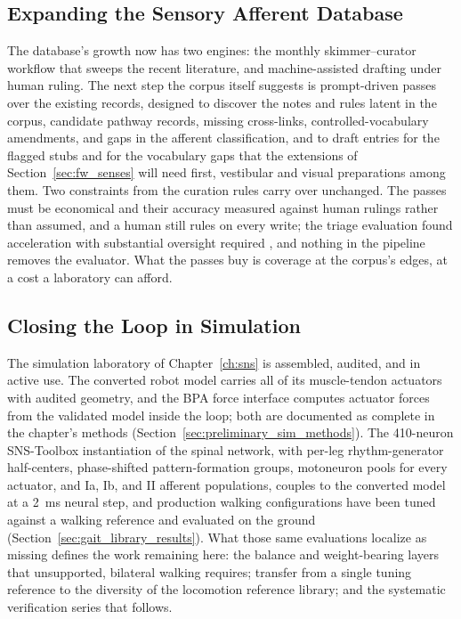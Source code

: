\subsection{Expanding the Sensory Afferent Database}\label{sec:fw_database}

The database's growth now has two engines: the monthly skimmer--curator workflow that sweeps the recent literature, and machine-assisted drafting under human ruling. The next step the corpus itself suggests is prompt-driven passes over the existing records, designed to discover the notes and rules latent in the corpus, candidate pathway records, missing cross-links, controlled-vocabulary amendments, and gaps in the afferent classification, and to draft entries for the flagged stubs and for the vocabulary gaps that the extensions of Section~\ref{sec:fw_senses} will need first, vestibular and visual preparations among them. Two constraints from the curation rules carry over unchanged. The passes must be economical and their accuracy measured against human rulings rather than assumed, and a human still rules on every write; the triage evaluation found acceleration with substantial oversight required \citep{bolen_using_2024}, and nothing in the pipeline removes the evaluator. What the passes buy is coverage at the corpus's edges, at a cost a laboratory can afford.

\subsection{Closing the Loop in Simulation}\label{sec:fw_pipeline}\label{sec:fw_cpg}

The simulation laboratory of Chapter~\ref{ch:sns} is assembled, audited, and in active use. The converted robot model carries all of its muscle-tendon actuators with audited geometry, and the BPA force interface computes actuator forces from the validated model inside the loop; both are documented as complete in the chapter's methods (Section~\ref{sec:preliminary_sim_methods}). The 410-neuron SNS-Toolbox instantiation of the spinal network, with per-leg rhythm-generator half-centers, phase-shifted pattern-formation groups, motoneuron pools for every actuator, and Ia, Ib, and II afferent populations, couples to the converted model at a \qty{2}{\milli\second} neural step, and production walking configurations have been tuned against a walking reference and evaluated on the ground (Section~\ref{sec:gait_library_results}). What those same evaluations localize as missing defines the work remaining here: the balance and weight-bearing layers that unsupported, bilateral walking requires; transfer from a single tuning reference to the diversity of the locomotion reference library; and the systematic verification series that follows.

